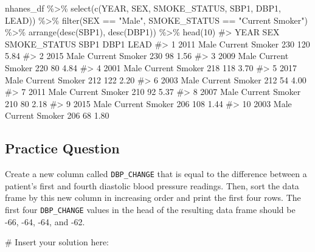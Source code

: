 \documentclass[
  letterpaper,
]{krantz}
\makeatletter
\newenvironment{Shaded}{\begin{snugshade}}{\end{snugshade}}
\newcommand{\CommentTok}[1]{\textcolor[rgb]{0.37,0.37,0.37}{#1}}
\newcommand{\DecValTok}[1]{\textcolor[rgb]{0.68,0.00,0.00}{#1}}
\newcommand{\FunctionTok}[1]{\textcolor[rgb]{0.28,0.35,0.67}{#1}}
\newcommand{\NormalTok}[1]{\textcolor[rgb]{0.00,0.23,0.31}{#1}}
\newcommand{\SpecialCharTok}[1]{\textcolor[rgb]{0.37,0.37,0.37}{#1}}
\newcommand{\StringTok}[1]{\textcolor[rgb]{0.13,0.47,0.30}{#1}}
\newenvironment{kframe}{%
\medskip{}
\setlength{\fboxsep}{.8em}
 \def\at@end@of@kframe{}%
 \ifinner\ifhmode%
  \def\at@end@of@kframe{\end{minipage}}%
  \begin{minipage}{\columnwidth}%
 \fi\fi%
 \def\FrameCommand##1{\hskip\@totalleftmargin \hskip-\fboxsep
 \colorbox{shadecolor}{##1}\hskip-\fboxsep
     \hskip-\linewidth \hskip-\@totalleftmargin \hskip\columnwidth}%
 \MakeFramed {\advance\hsize-\width
   \@totalleftmargin\z@ \linewidth\hsize
   \@setminipage}}%
 {\par\unskip\endMakeFramed%
 \at@end@of@kframe}
\renewenvironment{Shaded}{\begin{kframe}}{\end{kframe}}
\makeatother
\begin{document}
\begin{Shaded}
\begin{Highlighting}[]
\NormalTok{nhanes\_df }\SpecialCharTok{\%\textgreater{}\%} 
  \FunctionTok{select}\NormalTok{(}\FunctionTok{c}\NormalTok{(YEAR, SEX, SMOKE\_STATUS, SBP1, DBP1, LEAD)) }\SpecialCharTok{\%\textgreater{}\%}
  \FunctionTok{filter}\NormalTok{(SEX }\SpecialCharTok{==} \StringTok{"Male"}\NormalTok{, SMOKE\_STATUS }\SpecialCharTok{==} \StringTok{"Current Smoker"}\NormalTok{) }\SpecialCharTok{\%\textgreater{}\%}
  \FunctionTok{arrange}\NormalTok{(}\FunctionTok{desc}\NormalTok{(SBP1), }\FunctionTok{desc}\NormalTok{(DBP1)) }\SpecialCharTok{\%\textgreater{}\%}
  \FunctionTok{head}\NormalTok{(}\DecValTok{10}\NormalTok{)}
\CommentTok{\#\textgreater{}    YEAR  SEX   SMOKE\_STATUS SBP1 DBP1 LEAD}
\CommentTok{\#\textgreater{} 1  2011 Male Current Smoker  230  120 5.84}
\CommentTok{\#\textgreater{} 2  2015 Male Current Smoker  230   98 1.56}
\CommentTok{\#\textgreater{} 3  2009 Male Current Smoker  220   80 4.84}
\CommentTok{\#\textgreater{} 4  2001 Male Current Smoker  218  118 3.70}
\CommentTok{\#\textgreater{} 5  2017 Male Current Smoker  212  122 2.20}
\CommentTok{\#\textgreater{} 6  2003 Male Current Smoker  212   54 4.00}
\CommentTok{\#\textgreater{} 7  2011 Male Current Smoker  210   92 5.37}
\CommentTok{\#\textgreater{} 8  2007 Male Current Smoker  210   80 2.18}
\CommentTok{\#\textgreater{} 9  2015 Male Current Smoker  206  108 1.44}
\CommentTok{\#\textgreater{} 10 2003 Male Current Smoker  206   68 1.80}
\end{Highlighting}
\end{Shaded}

\hypertarget{practice-question-9}{%
\subsection{Practice Question}\label{practice-question-9}}

Create a new column called \texttt{DBP\_CHANGE} that is equal to the
difference between a patient's first and fourth diastolic blood pressure
readings. Then, sort the data frame by this new column in increasing
order and print the first four rows. The first four \texttt{DBP\_CHANGE}
values in the head of the resulting data frame should be -66, -64, -64,
and -62.

\begin{Shaded}
\begin{Highlighting}[]
\CommentTok{\# Insert your solution here:                    }
\end{Highlighting}
\end{Shaded}
\end{document}
